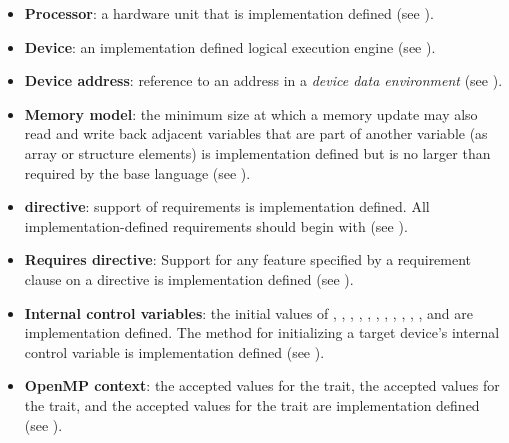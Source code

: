 \begin{itemize}
\item \textbf{Processor}: a hardware unit that is implementation defined (see
).

\item \textbf{Device}: an implementation defined logical execution engine (see
).

\item \textbf{Device address}: reference to an address in a \emph{device data environment} (see ).

\item \textbf{Memory model}: the minimum size at which a memory update may also read and
write back adjacent variables that are part of another variable (as array or structure
elements) is implementation defined but is no larger than required by the base
language (see ).

\item {} \textbf{directive}: support of requirements is implementation defined. All implementation-defined requirements should begin with  (see ).

\item \textbf{Requires directive}: Support for any feature specified by a
requirement clause on a  directive is implementation
defined (see ).

\item \textbf{Internal control variables}: the initial values of
, , ,
, , ,
, ,
, , ,
 and  are implementation defined.  The method for
initializing a target device's internal control variable is
implementation defined (see ).

\item \textbf{OpenMP context}: the accepted  values for
  the  trait, the accepted  values for the
   trait, and the accepted  values for
  the  trait are implementation defined (see
  ).


\end{itemize}
